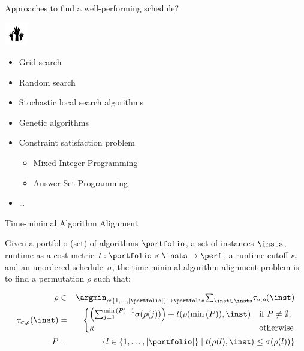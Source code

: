 \begin{frame}[c]{Approaches to find a well-performing schedule?}

\includegraphics[height=1cm]{images/hands.png}

\bigskip
\pause

\begin{itemize}
  \item Grid search
  \item Random search
  \item Stochastic local search algorithms
  \item Genetic algorithms
  \item Constraint satisfaction problem
  \begin{itemize}
    \item Mixed-Integer Programming
    \item Answer Set Programming
  \end{itemize}
  \item \ldots
\end{itemize}


\end{frame}
\begin{frame}[c]{Time-minimal Algorithm Alignment}

\begin{definition}
Given a portfolio (set) of algorithms $\portfolio$, a set of instances $\insts$,
runtime as a cost metric $t: \portfolio \times \insts \to \perf$,
a runtime cutoff $\kappa$,
and an unordered schedule~$\sigma$,
the time-minimal algorithm alignment problem is to find a permutation $\rho$ such that:

	\begin{eqnarray*}
	  \rho
	  & \in & 
	  \argmin_{\rho:\{1,\dots,|\portfolio|\}\rightarrow \portfolio}
	  \textstyle{\sum}_{\inst \in \insts}
	  \tau_{\sigma,\rho}(\inst)\\
	  \tau_{\sigma,\rho}(\inst) & = &
	    \begin{cases} 
	      \left(
	        \textstyle{\sum}_{j=1}^{\min{(P)} - 1}
	        \sigma(\rho(j))
	      \right)
	      +
	      t(\rho(\min{(P)}),\inst)
	       & \text{if $P \not= \emptyset$,}\\
	      \kappa & \text{otherwise}
	    \end{cases}\\
	P & = & \{ l \in \{1,\dots,|\portfolio|\} \mid t(\rho(l),\inst)\leq\sigma(\rho(l)) \}
	\end{eqnarray*}
\end{definition}

\end{frame}
